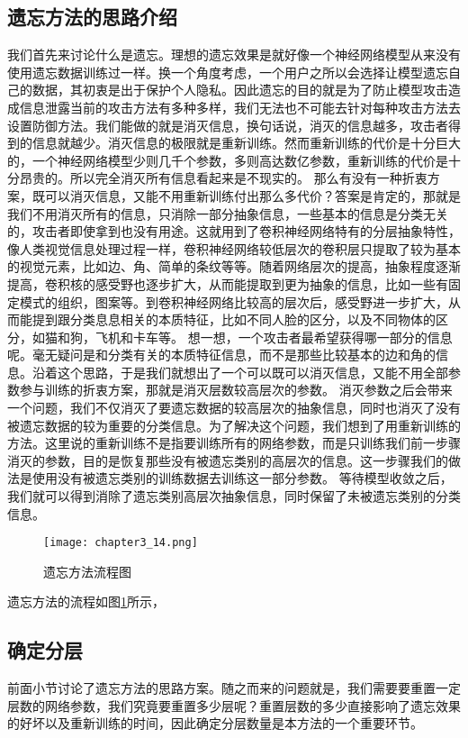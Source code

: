 \subsection{遗忘方法的思路介绍}
我们首先来讨论什么是遗忘。理想的遗忘效果是就好像一个神经网络模型从来没有使用遗忘数据训练过一样。换一个角度考虑，一个用户之所以会选择让模型遗忘自己的数据，其初衷是出于保护个人隐私。因此遗忘的目的就是为了防止模型攻击造成信息泄露当前的攻击方法有多种多样，我们无法也不可能去针对每种攻击方法去设置防御方法。我们能做的就是消灭信息，换句话说，消灭的信息越多，攻击者得到的信息就越少。消灭信息的极限就是重新训练。然而重新训练的代价是十分巨大的，一个神经网络模型少则几千个参数，多则高达数亿参数，重新训练的代价是十分昂贵的。所以完全消灭所有信息看起来是不现实的。
那么有没有一种折衷方案，既可以消灭信息，又能不用重新训练付出那么多代价？答案是肯定的，那就是我们不用消灭所有的信息，只消除一部分抽象信息，一些基本的信息是分类无关的，攻击者即使拿到也没有用途。这就用到了卷积神经网络特有的分层抽象特性，像人类视觉信息处理过程一样，卷积神经网络较低层次的卷积层只提取了较为基本的视觉元素，比如边、角、简单的条纹等等。随着网络层次的提高，抽象程度逐渐提高，卷积核的感受野也逐步扩大，从而能提取到更为抽象的信息，比如一些有固定模式的组织，图案等。到卷积神经网络比较高的层次后，感受野进一步扩大，从而能提到跟分类息息相关的本质特征，比如不同人脸的区分，以及不同物体的区分，如猫和狗，飞机和卡车等。
想一想，一个攻击者最希望获得哪一部分的信息呢。毫无疑问是和分类有关的本质特征信息，而不是那些比较基本的边和角的信息。沿着这个思路，于是我们就想出了一个可以既可以消灭信息，又能不用全部参数参与训练的折衷方案，那就是消灭层数较高层次的参数。
消灭参数之后会带来一个问题，我们不仅消灭了要遗忘数据的较高层次的抽象信息，同时也消灭了没有被遗忘数据的较为重要的分类信息。为了解决这个问题，我们想到了用重新训练的方法。这里说的重新训练不是指要训练所有的网络参数，而是只训练我们前一步骤消灭的参数，目的是恢复那些没有被遗忘类别的高层次的信息。这一步骤我们的做法是使用没有被遗忘类别的训练数据去训练这一部分参数。
等待模型收敛之后，我们就可以得到消除了遗忘类别高层次抽象信息，同时保留了未被遗忘类别的分类信息。
\begin{figure}
    \centering
    \texttt{[image: chapter3\_14.png]}
    \caption{遗忘方法流程图}
    \label{fig:chapter3_14}
\end{figure}
遗忘方法的流程如图\ref{fig:chapter3_14}所示，

\subsection{确定分层}

前面小节讨论了遗忘方法的思路方案。随之而来的问题就是，我们需要要重置一定层数的网络参数，我们究竟要重置多少层呢？重置层数的多少直接影响了遗忘效果的好坏以及重新训练的时间，因此确定分层数量是本方法的一个重要环节。

